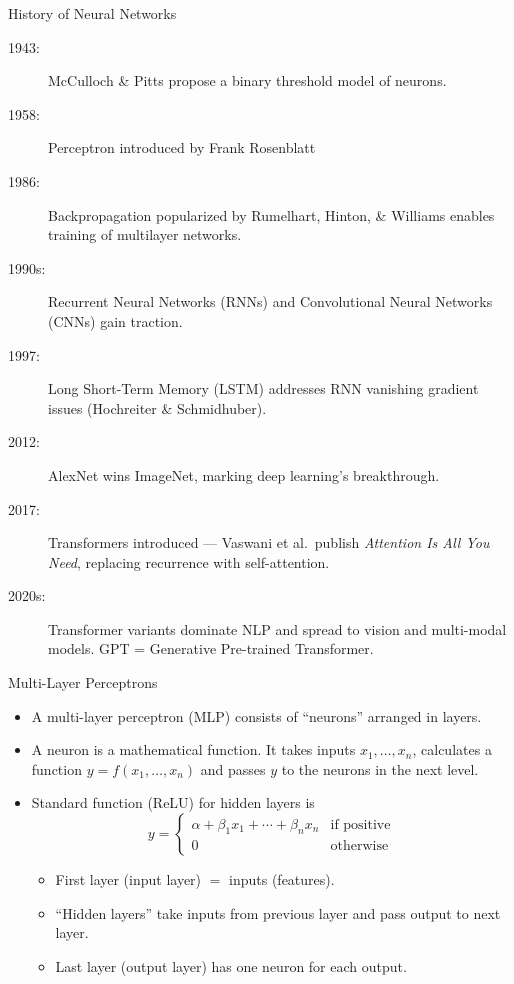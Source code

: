 \documentclass[10pt]{beamer}
\begin{document}
\begin{frame}{History of Neural Networks}
    \begin{description}
      \item[1943:] McCulloch \& Pitts propose a binary threshold model of neurons.
      \item[1958:] Perceptron introduced by Frank Rosenblatt 
      \item[1986:] Backpropagation popularized by Rumelhart, Hinton, \& Williams enables training of multilayer networks.
      \item[1990s:] Recurrent Neural Networks (RNNs) and Convolutional Neural Networks (CNNs) gain traction.
      \item[1997:] Long Short-Term Memory (LSTM) addresses RNN vanishing gradient issues (Hochreiter \& Schmidhuber).
      \item[2012:] AlexNet wins ImageNet, marking deep learning's breakthrough.
      \item[2017:] \alert{Transformers introduced} --- Vaswani et al.\ publish \emph{Attention Is All You Need}, replacing recurrence with self-attention.
      \item[2020s:] Transformer variants dominate NLP and spread to vision and multi-modal models. GPT = Generative Pre-trained Transformer.
   \end{description}
\end{frame}

\begin{frame}{Multi-Layer Perceptrons}
    \begin{itemize}
        \item A multi-layer perceptron (MLP) consists of ``neurons'' arranged in layers.
        \item A neuron is a mathematical function. It takes inputs $x_1, \ldots, x_n$, calculates a function $y=f(x_1, \ldots, x_n)$ and passes $y$ to the neurons in the next level.
        \item Standard function (ReLU) for hidden layers is 
        $$y = \begin{cases}\alpha+\beta_1x_1 + \cdots + \beta_nx_n & \text{if positive} \\ 0 & \text{otherwise}\end{cases}$$
        \begin{itemize}
            \item First layer (input layer) $=$ inputs (features).
            \item ``Hidden layers'' take inputs from previous layer and pass output to next layer.
            \item Last layer (output layer) has one neuron for each output.
        \end{itemize}
    \end{itemize}
    \end{frame}
    
\end{document}
